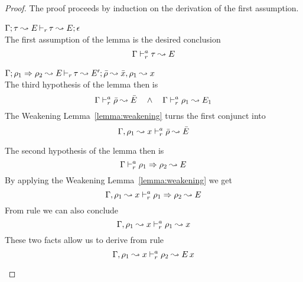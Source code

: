 \begin{proof}
The proof proceeds by induction on the derivation of the first assumption.
\begin{description}
\setlength{\itemsep}{1em}
\item[\fbox{\texttt{(M-Simp)}}]\quad$\Gamma;\tau\leadsto E \mathop{\vdash_{r}} \tau \leadsto E; \epsilon$ \ \\
  The first assumption of the lemma is the desired conclusion
\begin{equation*}
  \Gamma \vdash^a_{r} \tau \leadsto E
\end{equation*}

\item[\fbox{\texttt{(M-IApp)}}]\quad$\Gamma; \rho_1 \Rightarrow \rho_2 \leadsto E \mathop{\vdash_{r}} \tau \leadsto E'; \bar{\rho} \leadsto \bar{x}, \rho_1 \leadsto x$ \ \\
  The third hypothesis of the lemma then is
\begin{equation*}
  \Gamma \vdash^a_{r} \bar{\rho} \leadsto \bar{E} \quad\wedge\quad \Gamma \vdash^a_{r} \rho_1 \leadsto E_1
\end{equation*}
  The Weakening Lemma~\ref{lemma:weakening} turns the first conjunct into
\begin{equation*}
  \Gamma, \rho_1 \leadsto x \vdash^a_{r} \bar{\rho} \leadsto \bar{E}
\end{equation*}

  The second hypothesis of the lemma then is
\begin{equation*}
  \Gamma \vdash^a_{r} \rho_1 \Rightarrow \rho_2 \leadsto E
\end{equation*}
  By applying the Weakening Lemma~\ref{lemma:weakening} we get
\begin{equation*}
  \Gamma, \rho_1 \leadsto x \vdash^a_{r} \rho_1 \Rightarrow \rho_2 \leadsto E
\end{equation*}
  From rule  we can also conclude
\begin{equation*}
  \Gamma, \rho_1 \leadsto x \vdash^a_{r} \rho_1 \leadsto x
\end{equation*}
  These two facts allow us to derive from rule 
\begin{equation*}
  \Gamma, \rho_1 \leadsto x \vdash^a_{r} \rho_2 \leadsto E\,x 
\end{equation*}


\end{description}
\end{proof}
